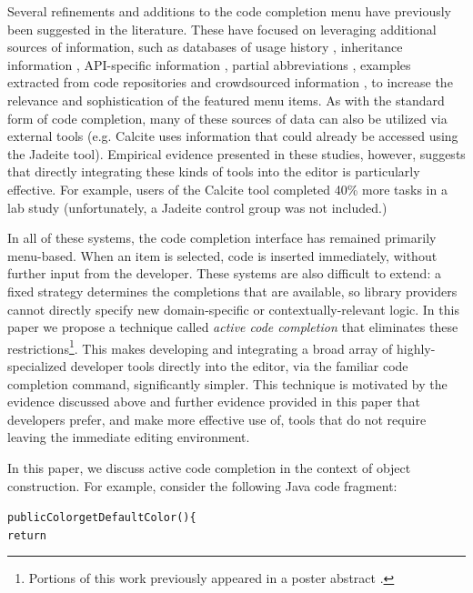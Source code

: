 \documentclass[10pt, conference, compsocconf]{IEEEtran}
\begin{document}
Several refinements and additions to the code completion menu have previously been suggested in the literature. These have focused on leveraging additional sources of information, such as databases of usage history \cite{robbes_how_2008}\cite{HouPletcher2011}, inheritance information \cite{HouPletcher2011}, API-specific information \cite{HouPletcher2011}\cite{Lee+2008}, partial abbreviations \cite{Han+2009}, examples extracted from code repositories \cite{bruch_learning_2009}\cite{Brandt+2010} and crowdsourced information \cite{mooty_calcite:_2010}\cite{SnipMatch}, to increase the relevance and sophistication of the featured menu items. As with the standard form of code completion, many of these sources of data can also be utilized via external tools (e.g. Calcite \cite{mooty_calcite:_2010} uses information that could already be accessed using the Jadeite \cite{conf/vl/StylosFYM09} tool). Empirical evidence presented in these studies, however, suggests that directly integrating these kinds of tools into the editor is particularly effective. For example, users of the Calcite tool completed 40\% more tasks in a lab study (unfortunately, a Jadeite control group was not included.)

In all of these systems, the code completion interface has remained primarily menu-based. When an item is selected, code is inserted immediately, without further input from the developer. These systems are also difficult to extend: a fixed strategy determines the completions that are available, so library providers cannot directly specify new domain-specific or contextually-relevant logic. 
In this paper we propose a technique called {\it active code completion} that eliminates these restrictions\footnote{Portions of this work previously appeared in a poster abstract \cite{ACC_VLHCC}.}. This  makes developing and integrating a broad array of highly-specialized developer tools directly into the editor, via the familiar code completion command, significantly simpler. This technique is motivated by the evidence discussed above and further evidence provided in this paper that developers prefer, and make more effective use of, tools that do not require leaving the immediate editing environment.

In this paper, we discuss active code completion in the context of object construction. For example, consider the following Java code fragment:

\begin{alltt}
  public Color getDefaultColor() \{
      return \textvisiblespace
\end{alltt}
\end{document}
